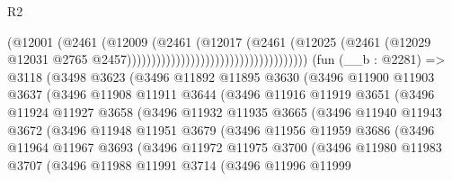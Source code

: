\begin{lexlean}{R2}
\begin{coremodule}
                                                            (@12001
                                                              (@2461
                                                                (@12009
                                                                  (@2461
                                                                    (@12017
                                                                      (@2461
                                                                        (@12025
                                                                          (@2461
                                                                            (@12029
                                                                              @12031
                                                                              @2765
                                                                              @2457)))))))))))))))))))))))))))))))))))))
    (fun (__b : @2281) =>
    @3118
      (@3498
        @3623
        (@3496
          @11892
          @11895
          @3630
          (@3496
            @11900
            @11903
            @3637
            (@3496
              @11908
              @11911
              @3644
              (@3496
                @11916
                @11919
                @3651
                (@3496
                  @11924
                  @11927
                  @3658
                  (@3496
                    @11932
                    @11935
                    @3665
                    (@3496
                      @11940
                      @11943
                      @3672
                      (@3496
                        @11948
                        @11951
                        @3679
                        (@3496
                          @11956
                          @11959
                          @3686
                          (@3496
                            @11964
                            @11967
                            @3693
                            (@3496
                              @11972
                              @11975
                              @3700
                              (@3496
                                @11980
                                @11983
                                @3707
                                (@3496
                                  @11988
                                  @11991
                                  @3714
                                  (@3496
                                    @11996
                                    @11999

\end{coremodule}
\end{lexlean}
